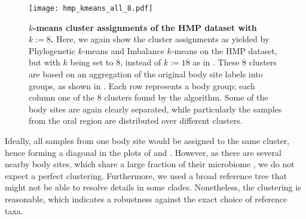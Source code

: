 \begin{figure}[hpbt]
    \centering
    \texttt{[image: hmp\_kmeans\_all\_8.pdf]}
    \begin{subfigure}{0pt}
        \label{fig:hmp_kmeans_all_8:sub:em_unconstr}
    \end{subfigure}
    \begin{subfigure}{0pt}
        \label{fig:hmp_kmeans_all_8:sub:ei_unconstr}
    \end{subfigure}
    \caption[$k$-means cluster assignments of the \acs{HMP} dataset with $k:=8$]{
        \textbf{$k$-means cluster assignments of the \acs{HMP} dataset with $k:=8$.}
        Here, we again show the cluster assignments as yielded by
         Phylogenetic $k$-means and
         Imbalance $k$-means on the \ac{HMP} dataset,
        but with $k$ being set to 8, instead of $k:=18$ as in .
        These \num{8} clusters are based on an aggregation of the original body site labels into groups,
        as shown in .
        Each row represents a body group; each column one of the \num{8} clusters found by the algorithm.
        Some of the body sites are again clearly separated,
        while particularly the samples from the oral region are distributed over different clusters.
    }
    \label{fig:hmp_kmeans_all_8}
\end{figure}

Ideally, all samples from one body site would be assigned to the same cluster,
hence forming a diagonal in the plots of  and .
However, as there are several nearby body sites, which share a large fraction of their microbiome \cite{Huttenhower2012},
we do not expect a perfect clustering.
Furthermore, we used a broad reference tree that might not be able to resolve details in some clades.
Nonetheless, the clustering is reasonable, which indicates a robustness against the exact choice of reference taxa.

